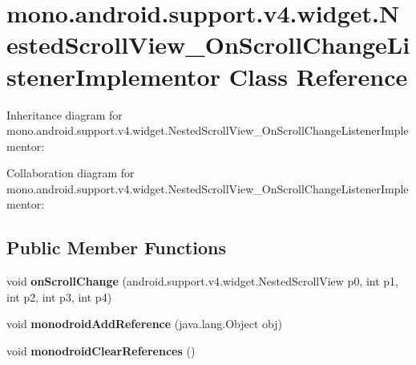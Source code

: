 \hypertarget{classmono_1_1android_1_1support_1_1v4_1_1widget_1_1_nested_scroll_view___on_scroll_change_listener_implementor}{}\section{mono.\+android.\+support.\+v4.\+widget.\+Nested\+Scroll\+View\+\_\+\+On\+Scroll\+Change\+Listener\+Implementor Class Reference}
\label{classmono_1_1android_1_1support_1_1v4_1_1widget_1_1_nested_scroll_view___on_scroll_change_listener_implementor}


Inheritance diagram for mono.\+android.\+support.\+v4.\+widget.\+Nested\+Scroll\+View\+\_\+\+On\+Scroll\+Change\+Listener\+Implementor\+:


Collaboration diagram for mono.\+android.\+support.\+v4.\+widget.\+Nested\+Scroll\+View\+\_\+\+On\+Scroll\+Change\+Listener\+Implementor\+:
\subsection*{Public Member Functions}
\begin{DoxyCompactItemize}
\item 
\mbox{\label{classmono_1_1android_1_1support_1_1v4_1_1widget_1_1_nested_scroll_view___on_scroll_change_listener_implementor_ae77ca61884b43630951540c3040667fe}} 
void {\bfseries on\+Scroll\+Change} (android.\+support.\+v4.\+widget.\+Nested\+Scroll\+View p0, int p1, int p2, int p3, int p4)
\item 
\mbox{\label{classmono_1_1android_1_1support_1_1v4_1_1widget_1_1_nested_scroll_view___on_scroll_change_listener_implementor_a30cd540fd3bdbc6c89ff9ce53921ae1b}} 
void {\bfseries monodroid\+Add\+Reference} (java.\+lang.\+Object obj)
\item 
\mbox{\label{classmono_1_1android_1_1support_1_1v4_1_1widget_1_1_nested_scroll_view___on_scroll_change_listener_implementor_a51ab24482a8e50779f3d45a756028aff}} 
void {\bfseries monodroid\+Clear\+References} ()
\end{DoxyCompactItemize}
